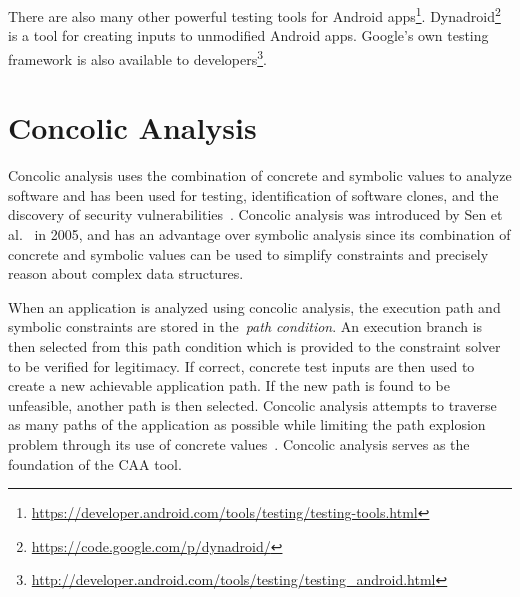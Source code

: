 \documentclass{sig-alternate}
\begin{document}
There are also many other powerful testing tools for Android apps\footnote{\url{https://developer.android.com/tools/testing/testing-tools.html}}. Dynadroid\footnote{\url{https://code.google.com/p/dynadroid/}} is a tool for creating inputs to unmodified Android apps. Google's own testing framework is also available to developers\footnote{\url{http://developer.android.com/tools/testing/testing_android.html}}.



\newpage
\section{Concolic Analysis}
\label{sec: concolicanalysis}


Concolic analysis uses the combination of concrete and symbolic values to analyze software and has been used for testing, identification of software clones, and the discovery of security vulnerabilities~\cite{Sen:2005:CCU:1081706.1081750, Chen:2014:CIB:2554850.2554875, Krutz_Sac15}. Concolic analysis was introduced by Sen et al.~\cite{Sen:2005:CCU:1081706.1081750} in 2005, and has an advantage over symbolic analysis since its combination of concrete and symbolic values can be used to simplify constraints and precisely reason about complex data structures. %


When an application is analyzed using concolic analysis, the execution path and symbolic constraints are stored in the~\emph{path condition}. An execution branch is then selected from this path condition which is provided to the constraint solver to be verified for legitimacy. If correct, concrete test inputs are then used to create a new achievable application path. If the new path is found to be unfeasible, another path is then selected. Concolic analysis attempts to traverse as many paths of the application as possible while limiting the path explosion problem through its use of concrete values~\cite{Jaffar:2013:BCT:2491411.2491425}. Concolic analysis serves as the foundation of the CAA tool.
\end{document}
